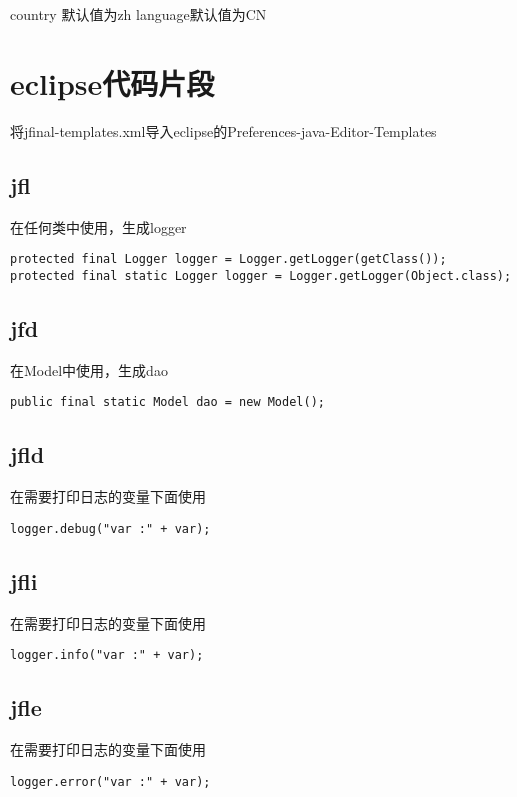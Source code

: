 \documentclass{scrartcl}
\begin{document}
country 默认值为zh language默认值为CN
\section{eclipse代码片段}
\label{sec-6}

 将jfinal-templates.xml导入eclipse的Preferences-java-Editor-Templates
\subsection{jfl}
\label{sec-6-1}

   在任何类中使用，生成logger
  

\begin{verbatim}
protected final Logger logger = Logger.getLogger(getClass());
protected final static Logger logger = Logger.getLogger(Object.class);
\end{verbatim}
\subsection{jfd}
\label{sec-6-2}

   在Model中使用，生成dao


\begin{verbatim}
public final static Model dao = new Model();
\end{verbatim}
\subsection{jfld}
\label{sec-6-3}


   在需要打印日志的变量下面使用

\begin{verbatim}
logger.debug("var :" + var);
\end{verbatim}
\subsection{jfli}
\label{sec-6-4}

   在需要打印日志的变量下面使用

\begin{verbatim}
logger.info("var :" + var);
\end{verbatim}
\subsection{jfle}
\label{sec-6-5}

   在需要打印日志的变量下面使用

\begin{verbatim}
logger.error("var :" + var);
\end{verbatim}
\end{document}
